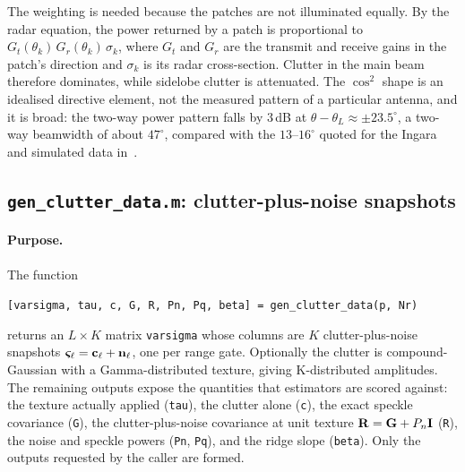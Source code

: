 \documentclass{article}
\begin{document}
The weighting is needed because the patches are not illuminated equally. By the radar equation, the power returned by a patch is proportional to $G_t(\theta_k)\,G_r(\theta_k)\,\sigma_k$, where $G_t$ and $G_r$ are the transmit and receive gains in the patch's direction and $\sigma_k$ is its radar cross-section. Clutter in the main beam therefore dominates, while sidelobe clutter is attenuated. The $\cos^2$ shape is an idealised directive element, not the measured pattern of a particular antenna, and it is broad: the two-way power pattern falls by $3$\,dB at $\theta-\theta_L\approx\pm23.5^\circ$, a two-way beamwidth of about $47^\circ$, compared with the $13$--$16^\circ$ quoted for the Ingara and simulated data in~\cite{Aboutanios2020}.

\subsection{\texttt{gen\_clutter\_data.m}: clutter-plus-noise snapshots}\label{sec:code:gcd}

\paragraph{Purpose.} The function
\begin{center}
  \texttt{[varsigma, tau, c, G, R, Pn, Pq, beta] = gen\_clutter\_data(p, Nr)}
\end{center}
returns an $L\times K$ matrix \texttt{varsigma} whose columns are $K$ clutter-plus-noise snapshots $\boldsymbol{\varsigma}_\ell = \vb c_\ell + \vb n_\ell$, one per range gate. Optionally the clutter is compound-Gaussian with a Gamma-distributed texture, giving K-distributed amplitudes. The remaining outputs expose the quantities that estimators are scored against: the texture actually applied (\texttt{tau}), the clutter alone (\texttt{c}), the exact speckle covariance (\texttt{G}), the clutter-plus-noise covariance at unit texture $\mathbf{R}=\mathbf{G}+P_n\mathbf{I}$ (\texttt{R}), the noise and speckle powers (\texttt{Pn}, \texttt{Pq}), and the ridge slope (\texttt{beta}). Only the outputs requested by the caller are formed.
\end{document}
